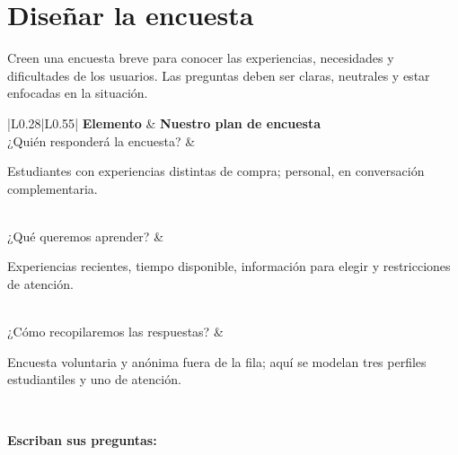 \documentclass[12pt]{article}
\newcommand{\sol}[1]{{\color{solutionred}\small\strut #1\strut}}
\begin{document}
	\section{Diseñar la encuesta}
	
	Creen una encuesta breve para conocer las experiencias, necesidades y dificultades de los usuarios. Las preguntas deben ser claras, neutrales y estar enfocadas en la situación.
	
	\vspace{-2.5mm}\begin{center}
		\small
		\begin{tabular}{|L{0.28\textwidth}|L{0.55\textwidth}|}
			\hline
			\textbf{Elemento} & \textbf{Nuestro plan de encuesta} \\
			\hline
			¿Quién responderá la encuesta? & \rule{0pt}{0.6cm}\begin{minipage}[b]{\linewidth}\sol{Estudiantes con experiencias distintas de compra; personal, en conversación complementaria.}\end{minipage} \\
			\hline
			¿Qué queremos aprender? & \rule{0pt}{0.7cm}\begin{minipage}[b]{\linewidth}\sol{Experiencias recientes, tiempo disponible, información para elegir y restricciones de atención.}\end{minipage} \\
			\hline
			¿Cómo recopilaremos las respuestas? & \rule{0pt}{0.6cm}\begin{minipage}[b]{\linewidth}\sol{Encuesta voluntaria y anónima fuera de la fila; aquí se modelan tres perfiles estudiantiles y uno de atención.}\end{minipage} \\
			\hline
		\end{tabular}
	\end{center}\vspace{-2.5mm}
	
	\vspace{0.15cm}
	
	\textbf{Escriban sus preguntas:}
	
\end{document}
